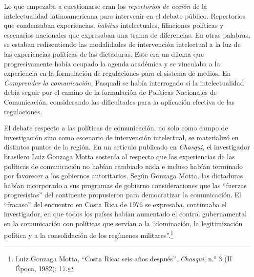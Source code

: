 \documentclass{tufte-handout}
\begin{document}
Lo que empezaba a cuestionarse eran los \emph{repertorios de acción} de
la intelectualidad latinoamericana para intervenir en el debate público.
Repertorios que condensaban experiencias, \emph{habitus} intelectuales,
filiaciones políticas y escenarios nacionales que expresaban una trama
de diferencias. En otras palabras, se estaban rediscutiendo las
modalidades de intervención intelectual a la luz de las experiencias
políticas de las dictaduras. Este era un dilema que progresivamente
había ocupado la agenda académica y se vinculaba a la experiencia en la
formulación de regulaciones para el sistema de medios. En
\emph{Comprender la comunicación}, Pasquali se había interrogado si la
intelectualidad debía seguir por el camino de la formulación de
Políticas Nacionales de Comunicación, considerando las dificultades para
la aplicación efectiva de las regulaciones.

El debate respecto a las políticas de comunicación, no solo como campo
de investigación sino como escenario de intervención intelectual, se
materializó en distintos puntos de la región. En un artículo publicado
en \emph{Chasqui}, el investigador brasilero Luiz Gonzaga Motta sostenía
al respecto que las experiencias de las políticas de comunicación no
habían cambiado nada e incluso habían terminado por favorecer a los
gobiernos autoritarios. Según Gonzaga Motta, las dictaduras habían
incorporado a sus programas de gobierno consideraciones que las
``fuerzas progresistas'' del continente propusieron para democratizar la
comunicación. El ``fracaso'' del encuentro en Costa Rica de 1976 se
expresaba, continuaba el investigador, en que todos los países habían
aumentado el control gubernamental en la comunicación con políticas que
servían a la ``dominación, la legitimización política y a la
consolidación de los regímenes militares''.\footnote{Luiz Gonzaga Motta,
  ``Costa Rica: seis años después'', \emph{Chasqui}, n.° 3 (II Época,
  1982): 17.}
\end{document}

